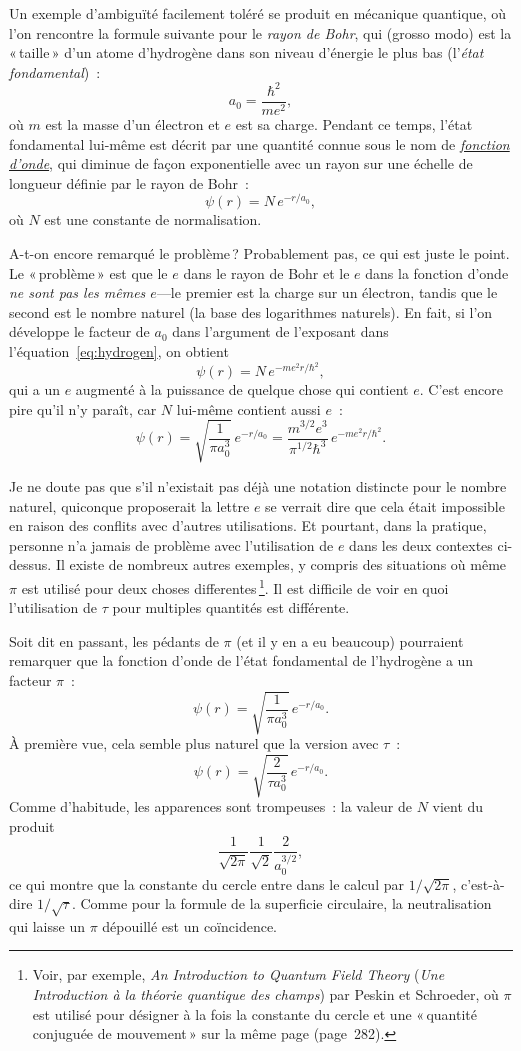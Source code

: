 Un exemple d'ambiguïté facilement toléré se produit en mécanique quantique, où l'on rencontre la formule suivante pour le \emph{rayon de Bohr}, qui (grosso modo) est la «\,taille\,» d'un atome d'hydrogène dans son niveau d'énergie le plus bas (l'\emph{état fondamental})~:
\[
a_0 = \frac{\hbar^2}{m e^2},
\]
où $m$ est la masse d'un électron et $e$ est sa charge. Pendant ce temps, l'état fondamental lui-même est décrit par une quantité connue sous le nom de \href{https://fr.wikipedia.org/wiki/Fonction_d%27onde}{\emph{fonction d'onde}}, qui diminue de façon exponentielle avec un rayon sur une échelle de longueur définie par le rayon de Bohr~:
\begin{equation}
\label{eq:hydrogen}
\psi(r) = N\,e^{-r/a_0},
\end{equation}
où $N$ est une constante de normalisation.

A-t-on encore remarqué le problème\,? Probablement pas, ce qui est juste le point. Le «\,problème\,» est que le $e$ dans le rayon de Bohr et le $e$ dans la fonction d'onde \emph{ne sont pas les mêmes $e$}---le premier est la charge sur un électron, tandis que le second est le nombre naturel (la base des logarithmes naturels). En fait, si l'on développe le facteur de $a_0$ dans l'argument de l'exposant dans l'équation~\eqref{eq:hydrogen}, on obtient
\[
\psi(r) = N\,e^{-m e^2 r/\hbar^2},
\]
qui a un $e$ augmenté à la puissance de quelque chose qui contient $e$. C'est encore pire qu'il n'y paraît, car $N$ lui-même contient aussi $e$~:
\[
\psi(r) = \sqrt{\frac{1}{\pi a_0^3}}\,e^{-r/a_0} =
\frac{m^{3/2} e^3}{\pi^{1/2} \hbar^3}\,e^{-m e^2 r/\hbar^2}.
\]

Je ne doute pas que s'il n'existait pas déjà une notation distincte pour le nombre naturel, quiconque proposerait la lettre $e$ se verrait dire que cela était impossible en raison des conflits avec d'autres utilisations. Et pourtant, dans la pratique, personne n'a jamais de problème avec l'utilisation de $e$ dans les deux contextes ci-dessus.
Il existe de nombreux autres exemples, y compris des situations où même $\pi$ est utilisé pour deux choses differentes\,\footnote{Voir, par exemple, \emph{An Introduction to Quantum Field Theory} (\emph{Une Introduction à la théorie quantique des champs}) par Peskin et Schroeder, où $\pi$ est utilisé pour désigner à la fois la constante du cercle et une «\,quantité conjuguée de mouvement\,» sur la même page (page~282).}. Il est difficile de voir en quoi l'utilisation de $\tau$ pour multiples quantités est différente.

Soit dit en passant, les pédants de $\pi$ (et il y en a eu beaucoup) pourraient remarquer que la fonction d'onde de l'état fondamental de l'hydrogène a un facteur $\pi$~:
\[
\psi(r) = \sqrt{\frac{1}{\pi a_0^3}}\,e^{-r/a_0}.
\]
À première vue, cela semble plus naturel que la version avec $\tau$~:
\[
\psi(r) = \sqrt{\frac{2}{\tau a_0^3}}\,e^{-r/a_0}.
\]
Comme d'habitude, les apparences sont trompeuses~: la valeur de $N$ vient du produit
\[
\frac{1}{\sqrt{2\pi}} \frac{1}{\sqrt{2}} \frac{2}{a_0^{3/2}},
\]
ce qui montre que la constante du cercle entre dans le calcul par $1/\sqrt{2\pi}$, c'est-à-dire $1/\sqrt{\tau}$. Comme pour la formule de la superficie circulaire, la neutralisation qui laisse un $\pi$ dépouillé est un coïncidence.

